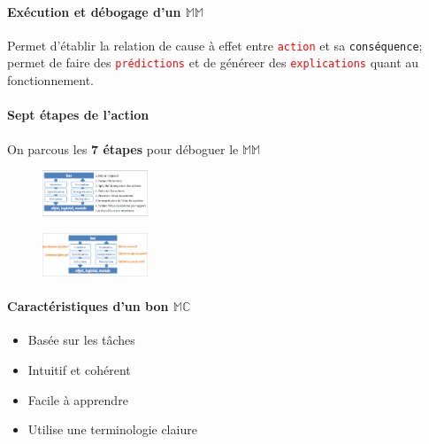 \documentclass{report}
\begin{document}
\begin{multicols*}{3}
\begin{itemize}
    \paragraph{Exécution et débogage d'un $\mathbb{MM}$}
    Permet d'établir la relation de cause à effet 
    entre \textcolor{red}{\texttt{action}} et sa 
    \texttt{conséquence}; permet de faire 
    des \textcolor{red}{\texttt{prédictions}} et de généreer des 
    \textcolor{red}{\texttt{explications}} quant au 
    fonctionnement. 


    \paragraph{Sept étapes de l'action}
    On parcous les 
    \textbf{7 étapes} pour déboguer le $\mathbb{MM}$  

    \begin{figure}[H]
      \begin{center}
        \includegraphics[width=0.28\textwidth]{EtapesAction.png}
      \end{center}
    \end{figure}

    \vspace{-2em}
    \begin{figure}[H]
      \begin{center}
        \includegraphics[width=0.28\textwidth]{Action2.png}
      \end{center}
    \end{figure}


    \paragraph{Caractéristiques d'un bon 
    $\mathbb{MC}$}

    \begin{itemize}
      \item Basée sur les tâches 
      \item Intuitif et cohérent 
      \item Facile à apprendre
      \item Utilise une terminologie claiure 
    \end{itemize}



\end{itemize}
\end{multicols*}
\end{document}
